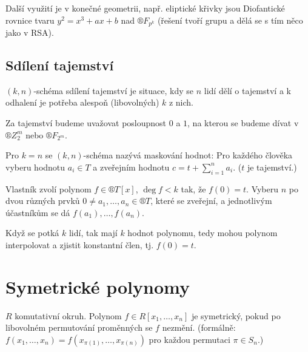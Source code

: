 \documentclass[12pt]{article}                   %
\begin{document}
    \begin{poznamka}
        Další využití je v konečné geometrii, např. eliptické křivky jsou Diofantické rovnice tvaru $y^2 = x^3 + ax + b$ nad $®F_{p^k}$ (řešení tvoří grupu a dělá se s tím něco jako v RSA).
    \end{poznamka}

    \subsection{Sdílení tajemství}
        \begin{definice}
            $(k, n)$-schéma sdílení tajemství je situace, kdy se $n$ lidí dělí o tajemství a k odhalení je potřeba alespoň (libovolných) $k$ z nich.
        \end{definice}

        \begin{definice}[Tajemství]
            Za tajemství budeme uvažovat posloupnost $0$ a $1$, na kterou se budeme dívat v $®Z_2^m$ nebo $®F_{2^m}$.
        \end{definice}

        \begin{poznamka}
            Pro $k = n$ se $(k, n)$-schéma nazývá maskování hodnot: Pro každého člověka vyberu hodnotu $a_i \in T$ a zveřejním hodnotu $c = t + \sum_{i=1}^n a_i$. ($t$ je tajemství.)
        \end{poznamka}

        \begin{definice}
                Vlastník zvolí polynom $f \in ®T[x]$, $\deg f < k$ tak, že $f(0) = t$. Vyberu $n$ po dvou různých prvků $0 ≠ a_1, …, a_n \in ®T$, které se zveřejní, a jednotlivým účastníkům se dá $f(a_1), …, f(a_n)$.

            Když se potká $k$ lidí, tak mají $k$ hodnot polynomu, tedy mohou polynom interpolovat a zjistit konstantní člen, tj. $f(0) = t$.
        \end{definice}

\section{Symetrické polynomy}
    \begin{definice}
        $R$ komutativní okruh. Polynom $f \in R[x_1, …, x_n]$ je symetrický, pokud po libovolném permutování proměnných se $f$ nezmění. (formálně: $f(x_1, …, x_n) = f(x_{\pi(1)}, …, x_{\pi(n)})$ pro každou permutaci $\pi \in S_n$.)
    \end{definice}
\end{document}
